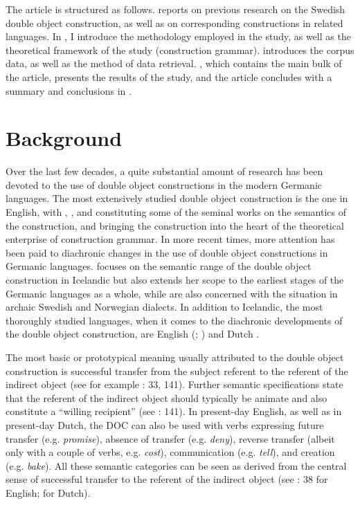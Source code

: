 \documentclass[output=paper]{langscibook}
\begin{document}
The article is structured as follows.  reports on previous research on the Swedish double object construction, as well as on corresponding constructions in related languages. In , I introduce the methodology employed in the study, as well as the theoretical framework of the study (construction grammar).  introduces the corpus data, as well as the method of data retrieval. , which contains the main bulk of the article, presents the results of the study, and the article concludes with a summary and conclusions in .


\section{Background}\label{sec:valdeson:2}


Over the last few decades, a quite substantial amount of research has been devoted to the use of double object constructions in the modern Germanic languages. The most extensively studied double object construction is the one in English, with \citet{Green1974}, \citet{Wierzbicka1988}, and \citet{Pinker1989} constituting some of the seminal works on the semantics of the construction, and \citet{Goldberg1995} bringing the construction into the heart of the theoretical enterprise of construction grammar. In more recent times, more attention has been paid to diachronic changes in the use of double object constructions in Germanic languages. \textcite{Bardal2007} focuses on the semantic range of the double object construction in Icelandic but also extends her scope to the earliest stages of the Germanic languages as a whole, while \textcite{Bardal2011} are also concerned with the situation in archaic Swedish and Norwegian dialects. In addition to Icelandic, the most thoroughly studied languages, when it comes to the diachronic developments of the double object construction, are English (\citealt{CollemanDe_Clerck2008, CollemanDe_Clerck2011, CollemanDe_Clerck2008}; \citealt{Zehentner2018}) and Dutch \citep{Colleman2011}.



The most basic or prototypical meaning usually attributed to the double object construction is successful transfer from the subject referent to the referent of the indirect object (see for example \citealt{Goldberg1995}: 33, 141). Further semantic specifications state that the referent of the indirect object should typically be animate and also constitute a “willing recipient” (see \citealt{Goldberg1995}: 141). In present-day English, as well as in present-day Dutch, the DOC can also be used with verbs expressing future transfer (e.g. \textit{promise}), absence of transfer (e.g. \textit{deny}), reverse transfer (albeit only with a couple of verbs, e.g. \textit{cost}), communication (e.g. \textit{tell}), and creation (e.g. \textit{bake}). All these semantic categories can be seen as derived from the central sense of successful transfer to the referent of the indirect object (see \citealt{Goldberg1995}: 38 for English; \citealt{Geeraerts1998} for Dutch). 
\end{document}
